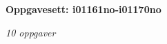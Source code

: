 \centerline{\bf Oppgavesett: i01161no-i01170no}
\vskip 10pt
\centerline{\it 10 oppgaver}\vskip 10pt
\vskip 10pt
